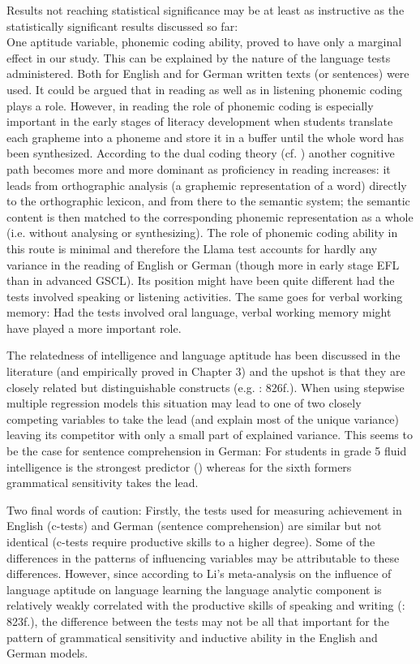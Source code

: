 \documentclass[output=paper]{langsci/langscibook}
\begin{document}
Results not reaching statistical significance may be at least as instructive as the statistically significant results discussed so far:\\
One aptitude variable, phonemic coding ability, proved to have only a marginal effect in our study. This can be explained by the nature of the language tests administered. Both for English and for German written texts (or sentences) were used. It could be argued that in reading as well as in listening phonemic coding plays a role. However, in reading the role of phonemic coding is especially important in the early stages of literacy development when students translate each grapheme into a phoneme and store it in a buffer until the whole word has been synthesized. According to the dual coding theory (cf. \citealt{ColtheartEtAl2001}) another cognitive path becomes more and more dominant as proficiency in reading increases: it leads from orthographic analysis (a graphemic representation of a word) directly to the orthographic lexicon, and from there to the semantic system; the semantic content is then matched to the corresponding phonemic representation as a whole (i.e. without analysing or synthesizing). The role of phonemic coding ability in this route is minimal and therefore the Llama test accounts for hardly any variance in the reading of English or German (though more in early stage EFL than in advanced GSCL). Its position might have been quite different had the tests involved speaking or listening activities. The same goes for verbal working memory: Had the tests involved oral language, verbal working memory might have played a more important role. 

The relatedness of intelligence and language aptitude has been discussed in the literature (and empirically proved in Chapter 3) and the upshot is that they are closely related but distinguishable constructs (e.g. \citealt{Li2016}: 826f.). When using stepwise multiple regression models this situation may lead to one of two closely competing variables to take the lead (and explain most of the unique variance) leaving its competitor with only a small part of explained variance. This seems to be the case for sentence comprehension in German: For students in grade 5 fluid intelligence is the strongest predictor () whereas for the sixth formers grammatical sensitivity takes the lead.

Two final words of caution: Firstly, the tests used for measuring achievement in English (c-tests) and German (sentence comprehension) are similar but not identical (c-tests require productive skills to a higher degree). Some of the differences in the patterns of influencing variables may be attributable to these differences. However, since according to Li’s meta-analysis on the influence of language aptitude on language learning the language analytic component is relatively weakly correlated with the productive skills of speaking and writing (\citealt{Li2016}: 823f.), the difference between the tests may not be all that important for the pattern of grammatical sensitivity and inductive ability in the English and German models.
\end{document}
